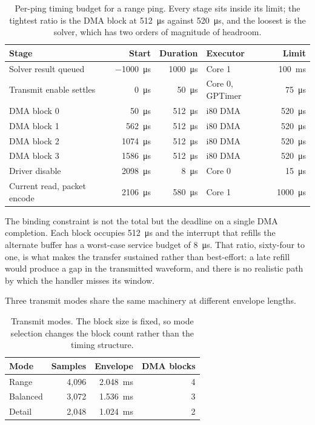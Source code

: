 \documentclass[conference,a4paper]{IEEEtran}
\begin{document}
\begin{table}[t]
\centering
\small
\begin{tabular}{lrrlr}
\toprule
\textbf{Stage} & \textbf{Start} & \textbf{Duration} & \textbf{Executor} & \textbf{Limit} \\
\midrule
Solver result queued & \SI{-1000}{\micro\second} & \SI{1000}{\micro\second} & Core 1 & \SI{100}{\milli\second} \\
Transmit enable settles & \SI{0}{\micro\second} & \SI{50}{\micro\second} & Core 0, GPTimer & \SI{75}{\micro\second} \\
DMA block 0 & \SI{50}{\micro\second} & \SI{512}{\micro\second} & i80 DMA & \SI{520}{\micro\second} \\
DMA block 1 & \SI{562}{\micro\second} & \SI{512}{\micro\second} & i80 DMA & \SI{520}{\micro\second} \\
DMA block 2 & \SI{1074}{\micro\second} & \SI{512}{\micro\second} & i80 DMA & \SI{520}{\micro\second} \\
DMA block 3 & \SI{1586}{\micro\second} & \SI{512}{\micro\second} & i80 DMA & \SI{520}{\micro\second} \\
Driver disable & \SI{2098}{\micro\second} & \SI{8}{\micro\second} & Core 0 & \SI{15}{\micro\second} \\
Current read, packet encode & \SI{2106}{\micro\second} & \SI{580}{\micro\second} & Core 1 & \SI{1000}{\micro\second} \\
\bottomrule
\end{tabular}
\caption{Per-ping timing budget for a range ping. Every stage sits inside its
limit; the tightest ratio is the DMA block at \SI{512}{\micro\second} against
\SI{520}{\micro\second}, and the loosest is the solver, which has two orders of
magnitude of headroom.}
\label{tab:timing}
\end{table}

The binding constraint is not the total but the deadline on a single DMA
completion. Each block occupies \SI{512}{\micro\second} and the interrupt that
refills the alternate buffer has a worst-case service budget of
\SI{8}{\micro\second}. That ratio, sixty-four to one, is what makes the transfer
sustained rather than best-effort: a late refill would produce a gap in the
transmitted waveform, and there is no realistic path by which the handler misses
its window.

Three transmit modes share the same machinery at different envelope lengths.

\begin{table}[t]
\centering
\small
\begin{tabular}{lrrr}
\toprule
\textbf{Mode} & \textbf{Samples} & \textbf{Envelope} & \textbf{DMA blocks} \\
\midrule
Range & 4{,}096 & \SI{2.048}{\milli\second} & 4 \\
Balanced & 3{,}072 & \SI{1.536}{\milli\second} & 3 \\
Detail & 2{,}048 & \SI{1.024}{\milli\second} & 2 \\
\bottomrule
\end{tabular}
\caption{Transmit modes. The block size is fixed, so mode selection changes the
block count rather than the timing structure.}
\label{tab:txmodes}
\end{table}
\end{document}
